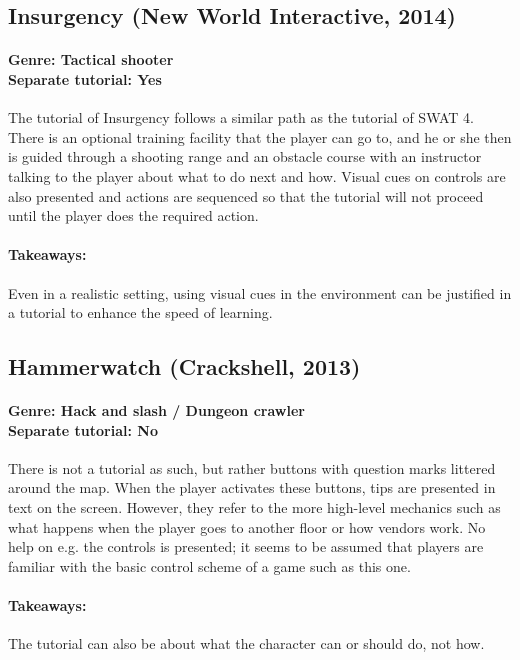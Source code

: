 \subsection{Insurgency (New World Interactive, 2014)}
\paragraph{Genre: Tactical shooter \\ Separate tutorial: Yes \\}
The tutorial of Insurgency follows a similar path as the tutorial of SWAT 4. There is an optional training facility that the player can go to, and he or she then is guided through a shooting range and an obstacle course with an instructor talking to the player about what to do next and how. Visual cues on controls are also presented and actions are sequenced so that the tutorial will not proceed until the player does the required action. 
\paragraph{Takeaways:}
Even in a realistic setting, using visual cues in the environment can be justified in a tutorial to enhance the speed of learning.

\subsection{Hammerwatch (Crackshell, 2013)}
\paragraph{Genre: Hack and slash / Dungeon crawler \\ Separate tutorial: No \\}
There is not a tutorial as such, but rather buttons with question marks littered around the map. When the player activates these buttons, tips are presented in text on the screen. However, they refer to the more high-level mechanics such as what happens when the player goes to another floor or how vendors work. No help on e.g. the controls is presented; it seems to be assumed that players are familiar with the basic control scheme of a game such as this one.
\paragraph{Takeaways:}
The tutorial can also be about what the character can or should do, not how.




